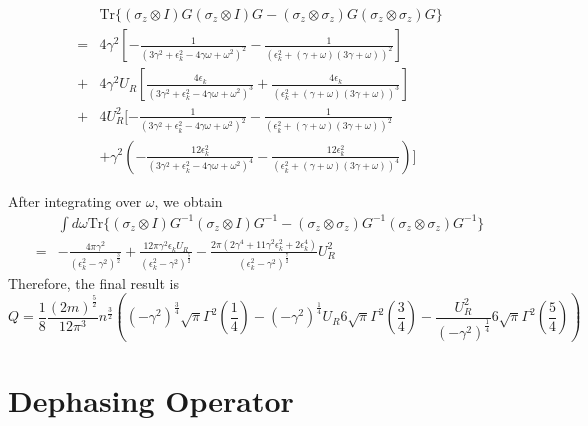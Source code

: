 \documentclass{article}
\begin{document}
\begin{align}
 & \mathrm{Tr}\{(\sigma_{z}\otimes I)G(\sigma_{z}\otimes I)G-(\sigma_{z}\otimes\sigma_{z})G(\sigma_{z}\otimes\sigma_{z})G\}\nonumber \\
= & 4\gamma^{2}[-\frac{1}{(3\gamma^{2}+\epsilon_{k}^{2}-4\gamma\omega+\omega^{2})^{2}}-\frac{1}{(\epsilon_{k}^{2}+(\gamma+\omega)(3\gamma+\omega))^{2}}]\nonumber \\
+ & 4\gamma^{2}U_{R}[\frac{4\epsilon_{k}}{(3\gamma^{2}+\epsilon_{k}^{2}-4\gamma\omega+\omega^{2})^{3}}+\frac{4\epsilon_{k}}{(\epsilon_{k}^{2}+(\gamma+\omega)(3\gamma+\omega))^{3}}]\nonumber \\
+ & 4U_{R}^{2}[-\frac{1}{(3\gamma^{2}+\epsilon_{k}^{2}-4\gamma\omega+\omega^{2})^{2}}-\frac{1}{(\epsilon_{k}^{2}+(\gamma+\omega)(3\gamma+\omega))^{2}}\nonumber \\
 & +\gamma^{2}(-\frac{12\epsilon_{k}^{2}}{(3\gamma^{2}+\epsilon_{k}^{2}-4\gamma\omega+\omega^{2})^{4}}-\frac{12\epsilon_{k}^{2}}{(\epsilon_{k}^{2}+(\gamma+\omega)(3\gamma+\omega))^{4}})]
\end{align}

After integrating over $\omega$, we obtain 
\begin{align}
 & \int d\omega\mathrm{Tr}\{(\sigma_{z}\otimes I)G^{-1}(\sigma_{z}\otimes I)G^{-1}-(\sigma_{z}\otimes\sigma_{z})G^{-1}(\sigma_{z}\otimes\sigma_{z})G^{-1}\}\nonumber \\
= & -\frac{4\pi\gamma^{2}}{(\epsilon_{k}^{2}-\gamma^{2})^{\frac{3}{2}}}+\frac{12\pi\gamma^{2}\epsilon_{k}U_{R}}{(\epsilon_{k}^{2}-\gamma^{2})^{\frac{5}{2}}}-\frac{2\pi(2\gamma^{4}+11\gamma^{2}\epsilon_{k}^{2}+2\epsilon_{k}^{4})}{(\epsilon_{k}^{2}-\gamma^{2})^{\frac{7}{2}}}U_{R}^{2}
\end{align}
Therefore, the final result is 
\begin{equation}
Q=\frac{1}{8}\frac{(2m)^{\frac{5}{2}}}{12\pi^{3}}n^{\frac{3}{2}}\left((-\gamma^{2})^{\frac{3}{4}}\sqrt{\pi}\Gamma^{2}(\frac{1}{4})-(-\gamma^{2})^{\frac{1}{4}}U_{R}6\sqrt{\pi}\Gamma^{2}(\frac{3}{4})-\frac{U_{R}^{2}}{(-\gamma^{2})^{\frac{1}{4}}}6\sqrt{\pi}\Gamma^{2}(\frac{5}{4})\right)
\end{equation}

\section{Dephasing Operator}
\end{document}
